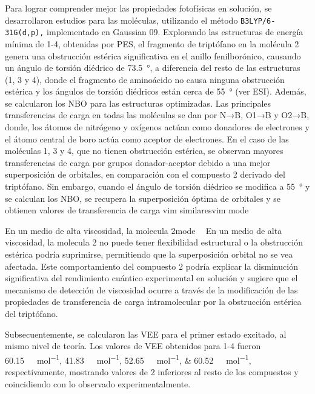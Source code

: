 Para lograr comprender mejor las propiedades fotofísicas en solución, se
desarrollaron estudios \insilico{} para las moléculas, utilizando el
método \texttt{B3LYP/6-31G(d,p),} implementado en Gaussian 09. Explorando las
estructuras de energía mínima de 1-4, obtenidas por \gls{PES}, el fragmento de
triptófano en la molécula 2 genera una obstrucción estérica significativa en el
anillo fenilborónico, causando un ángulo de torsión diédrico
de \qty{73.5}{\degree}, a diferencia del resto de las estructuras (1, 3 y
4), donde el fragmento de aminoácido
no causa ninguna obstrucción estérica y los ángulos de torsión diédricos están
cerca de \qty{55}{\degree} (ver ESI). Además, se calcularon
los \gls{NBO} para las estructuras optimizadas. Las principales transferencias
de carga en todas las moléculas se dan por N→B, O1→B y O2→B, donde, los átomos
de nitrógeno y oxígenos actúan como donadores de electrones y el átomo central
de boro actúa como aceptor de electrones. En el caso de las moléculas 1, 3 y
4, que no tienen obstrucción estérica,
se observan mayores transferencias de carga por grupos donador-aceptor debido a
una mejor superposición de orbitales, en comparación con el compuesto 2 derivado
del triptófano. Sin embargo, cuando el ángulo de torsión diédrico se modifica
a \qty{55}{\degree} y se calculan los \gls{NBO}, se recupera la superposición
óptima de orbitales y se obtienen valores de transferencia de carga vim
similaresvim mode

En un medio de alta viscosidad, la molecula 2\todo mode

En un medio de alta viscosidad, la molecula 2 no puede tener flexibilidad estructural o la obstrucción estérica podría suprimirse, permitiendo que la superposición orbital no se vea afectada. Este comportamiento del compuesto 2 podría explicar la disminución significativa del rendimiento cuántico experimental en solución y sugiere que el mecanismo de detección de viscosidad ocurre a través de la modificación de las propiedades de transferencia de carga intramolecular por la obstrucción estérica del triptófano.

Subsecuentemente, se calcularon las \gls{VEE} para el primer estado excitado, al mismo nivel de teoría. Los valores de \gls{VEE} obtenidos para 1-4 fueron \qtylist[list-units = bracket]{60.15;41.83;52.65;60.52}{\kilo\cal\per\mol}, respectivamente, mostrando valores de 2 inferiores al resto de los compuestos y coincidiendo con lo observado experimentalmente.

